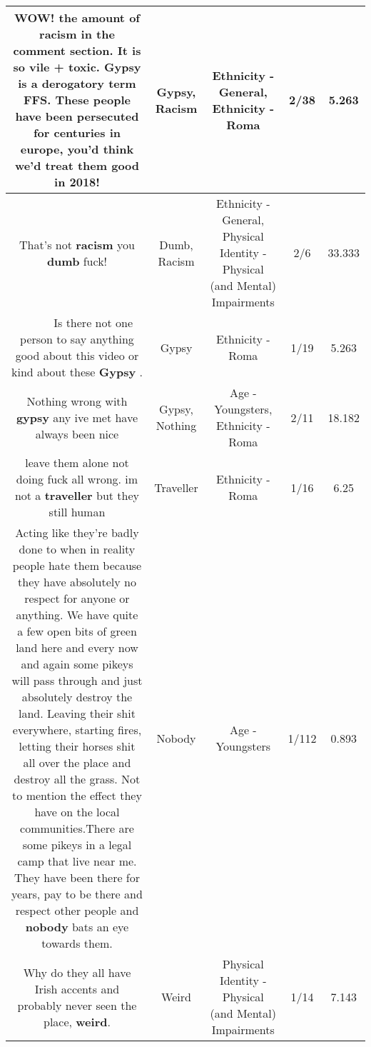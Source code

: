 \documentclass[11pt]{article}
\newlength\mylength
\begin{document}
\begin{center}
\begin{longtable}{|C{.65\mylength}|C{.30\mylength}|C{.12\mylength}|C{.12\mylength}|C{.12\mylength}|}
  \small WOW! the amount of \textbf{racism} in the comment section. It is so vile + toxic. \textbf{Gypsy} is a derogatory term FFS. These people have been persecuted for centuries in europe, you'd think we'd treat them good in 2018!\normalsize   & Gypsy, Racism & Ethnicity - General, Ethnicity - Roma & 2/38 & 5.263 \\  \hline
  \small That's not \textbf{racism} you \textbf{dumb} fuck!\normalsize   & Dumb, Racism & Ethnicity - General, Physical Identity - Physical (and Mental) Impairments & 2/6 & 33.333 \\  \hline
  \small ~~~~~  Is  there  not  one  person  to  say  anything   good  about  this  video  or  kind  about  these   \textbf{Gypsy}  .\normalsize   & Gypsy & Ethnicity - Roma & 1/19 & 5.263 \\  \hline
  \small Nothing wrong with \textbf{gypsy} any ive met have always been nice\normalsize   & Gypsy, Nothing & Age - Youngsters, Ethnicity - Roma & 2/11 & 18.182 \\  \hline
  \small leave them alone not doing fuck all wrong. im not a \textbf{traveller} but they still human\normalsize   & Traveller & Ethnicity - Roma & 1/16 & 6.25 \\  \hline
  \small Acting like they're badly done to when in reality people hate them because they have absolutely no respect for anyone or anything. We have quite a few open bits of green land here and every now and again some pikeys will pass through and just absolutely destroy the land. Leaving their shit everywhere, starting fires, letting their horses shit all over the place and destroy all the grass. Not to mention the effect they have on the local communities.There are some pikeys in a legal camp that live near me. They have been there for years, pay to be there and respect other people and \textbf{nobody} bats an eye towards them.\normalsize   & Nobody & Age - Youngsters & 1/112 & 0.893 \\  \hline
  \small Why do they all have Irish accents and probably never seen the place, \textbf{weird}.\normalsize   & Weird & Physical Identity - Physical (and Mental) Impairments & 1/14 & 7.143 \\  \hline

\end{longtable}
\end{center}
\end{document}
